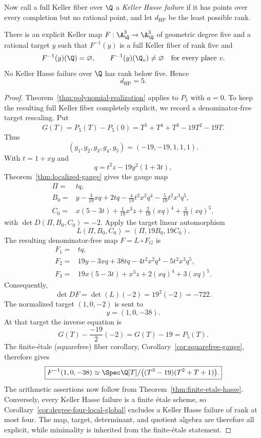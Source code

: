 Now call a full Keller fiber over \(\Q\) a \emph{Keller Hasse failure} if it
has points over every completion but no rational point, and let
\(d_{\mathrm{HP}}\) be the least possible rank.

\begin{corollary}\label{thm:hasse}
There is an explicit Keller map \(F:\A^3_\Q\to\A^3_\Q\) of geometric degree
five and a rational target \(y\) such that \(F^{-1}(y)\) is a full Keller
fiber of rank five and
\[
 F^{-1}(y)(\Q)=\varnothing,
 \qquad
 F^{-1}(y)(\Q_v)\neq\varnothing
 \quad\text{for every place }v.
\]
No Keller Hasse failure over \(\Q\) has rank below five.  Hence
\[
 \boxed{d_{\mathrm{HP}}=5}.
\]
\end{corollary}

\begin{proof}
Theorem~\ref{thm:polynomial-realization} applies to \(P_5\) with \(a=0\).
To keep the resulting full Keller fiber completely explicit, we record a
denominator-free target rescaling.  Put
\[
 G(T)=P_5(T)-P_5(0)=T^5+T^4+T^3-19T^2-19T.
\]
Thus
\[
 (g_1,g_2,g_3,g_4,g_5)=(-19,-19,1,1,1).
\]
With $t=1+xy$ and
\[
 q=t^2z-19y^2(1+3t),
\]
Theorem~\ref{thm:localized-gauge} gives the gauge map
\begin{align*}
 \Pi={}&tq,\\
 B_0={}&y-\frac3{19}xq+2tq
       -\frac4{19}t^2x^2q^4-\frac5{19}t^2x^3q^5,\\
 C_0={}&x(5-3t)+\frac1{19}x^3z
       +\frac2{19}(xq)^4+\frac3{19}(xq)^5,
\end{align*}
with $\det D(\Pi,B_0,C_0)=-2$.  Apply the target linear automorphism
\[
 L(\Pi,B_0,C_0)=(\Pi,19B_0,19C_0).
\]
The resulting denominator-free map $F=L\circ F_G$ is
\begin{equation}
\begin{aligned}
 F_1={}&tq,\\
 F_2={}&19y-3xq+38tq-4t^2x^2q^4-5t^2x^3q^5,\\
 F_3={}&19x(5-3t)+x^3z+2(xq)^4+3(xq)^5.
\end{aligned}
\label{eq:explicit-hasse-map}
\end{equation}
Consequently,
\[
 \boxed{\det DF=\det(L)(-2)=19^2(-2)=-722.}
\]
The normalized target $(1,0,-2)$ is sent to
\[
 y=(1,0,-38).
\]
At that target the inverse equation is
\[
 G(T)-\frac{-19}{2}(-2)=G(T)-19=P_5(T).
\]
The finite-\'etale (squarefree) fiber corollary,
Corollary~\ref{cor:squarefree-gauge}, therefore gives
\begin{equation}
 \boxed{F^{-1}(1,0,-38)\simeq
 \Spec\Q[T]/\bigl((T^3-19)(T^2+T+1)\bigr).}
 \label{eq:explicit-hasse-fiber}
\end{equation}
The arithmetic assertions now follow from
Theorem~\ref{thm:finite-etale-hasse}.  Conversely, every Keller Hasse failure
is a finite \'etale scheme, so
Corollary~\ref{cor:degree-four-local-global} excludes a
Keller Hasse failure of rank at most four.  The map, target, determinant, and
quotient algebra are therefore all explicit, while minimality is inherited
from the finite-\'etale statement.
\end{proof}

